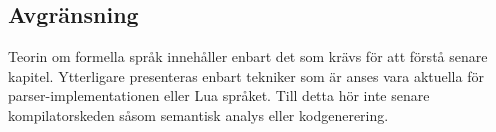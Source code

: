 \subsection{Avgränsning}

Teorin om formella språk innehåller enbart det som krävs för att förstå senare
kapitel. Ytterligare presenteras enbart tekniker som är anses vara aktuella
för parser-implementationen eller Lua språket. Till detta hör inte senare
kompilatorskeden såsom semantisk analys eller kodgenerering.

